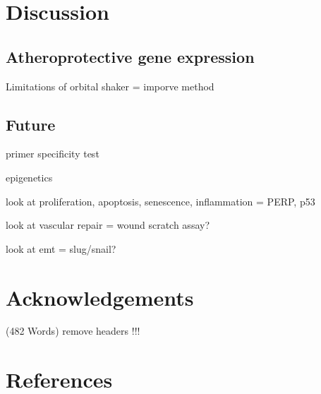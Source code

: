 \documentclass[
  12pt,
]{article}
\begin{document}
\hypertarget{discussion}{%
\section{Discussion}\label{discussion}}

\hypertarget{atheroprotective-gene-expression}{%
\subsection{Atheroprotective gene expression}\label{atheroprotective-gene-expression}}

Limitations of orbital shaker = imporve method

\hypertarget{future}{%
\subsection{Future}\label{future}}

primer specificity test

epigenetics

look at proliferation, apoptosis, senescence, inflammation = PERP, p53

look at vascular repair = wound scratch assay?

look at emt = slug/snail?

\hypertarget{acknowledgements}{%
\section{Acknowledgements}\label{acknowledgements}}

\begin{flushright}
(482 Words) remove headers !!!
\end{flushright}

\hypertarget{references}{%
\section{References}\label{references}}
\end{document}
